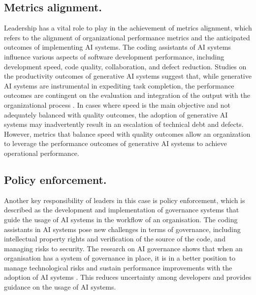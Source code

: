 \subsection {Metrics alignment.}
\label{sec:Metrics alignment}
Leadership has a vital role to play in the achievement of metrics alignment, which refers to the alignment of organizational performance metrics and the anticipated outcomes of implementing AI systems. The coding assistants of AI systems influence various aspects of software development performance, including development speed, code quality, collaboration, and defect reduction. Studies on the productivity outcomes of generative AI systems suggest that, while generative AI systems are instrumental in expediting task completion, the performance outcomes are contingent on the evaluation and integration of the output with the organizational process \autocite{Noy2023}. In cases where speed is the main objective and not adequately balanced with quality outcomes, the adoption of generative AI systems may inadvertently result in an escalation of technical debt and defects. However, metrics that balance speed with quality outcomes allow an organization to leverage the performance outcomes of generative AI systems to achieve operational performance.

\subsection {Policy enforcement.}
\label{sec:Policy enforcement}
Another key responsibility of leaders in this case is policy enforcement, which is described as the development and implementation of governance systems that guide the usage of AI systems in the workflow of an organisation. The coding assistants in AI systems pose new challenges in terms of governance, including intellectual property rights and verification of the source of the code, and managing risks to security. The research on AI governance shows that when an organisation has a system of governance in place, it is in a better position to manage technological risks and sustain performance improvements with the adoption of AI systems \autocite{Schneider2023}. This reduces uncertainty among developers and provides guidance on the usage of AI systems.

